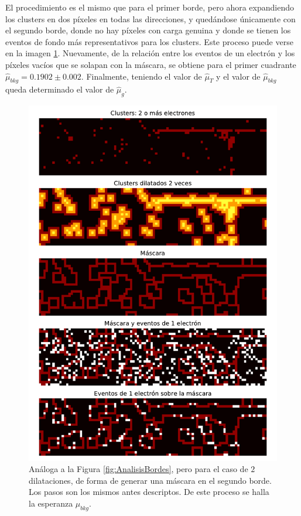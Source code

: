 El procedimiento es el mismo que para el primer borde, pero ahora expandiendo los clusters en dos píxeles en todas las direcciones, y quedándose únicamente con el segundo borde, donde no hay píxeles con carga genuina y donde se tienen los eventos de fondo más representativos para los clusters. Este proceso puede verse en la imagen \ref{fig:AnalisisBordesx2}. Nuevamente, de la relación entre los eventos de un electrón y los píxeles vacíos que se solapan con la máscara, se obtiene para el primer cuadrante $\hat{\mu}_{bkg} = 0.1902 \pm 0.002$. Finalmente, teniendo el valor de $\hat{\mu}_{T}$ y el valor de $\hat{\mu}_{bkg}$ queda determinado el valor de $\hat{\mu}_{g}$.
\begin{figure}[H]
    \centering
    \includegraphics[scale=0.65]{Figs/analisis_bordesx2.pdf}
    \caption{Análoga a la Figura \ref{fig:AnalisisBordes}, pero para el caso de $2$ dilataciones, de forma de generar una máscara en el segundo borde. Los pasos son los mismos antes descriptos. De este proceso se halla la esperanza $\mu_{bkg}$.}
    \label{fig:AnalisisBordesx2}
\end{figure}
